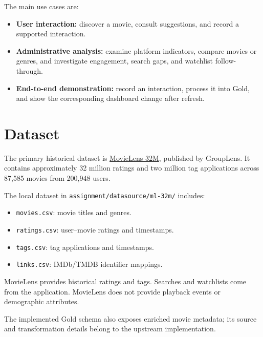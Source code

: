 \documentclass[a4paper,12pt]{article}
\begin{document}
The main use cases are:

\begin{itemize}
  \item \textbf{User interaction:}
  discover a movie, consult suggestions, and record
  a supported interaction.

  \item \textbf{Administrative analysis:}
  examine platform indicators, compare movies or genres,
  and investigate engagement, search gaps, and watchlist
  follow-through.

  \item \textbf{End-to-end demonstration:}
  record an interaction, process it into Gold, and show
  the corresponding dashboard change after refresh.
\end{itemize}


\clearpage
\section{Dataset}
\label{sec:dataset}

The primary historical dataset is
\href{https://grouplens.org/datasets/movielens/32m/}{MovieLens 32M},
published by GroupLens. It contains approximately 32 million ratings
and two million tag applications across 87,585 movies from
200,948 users.

The local dataset in \texttt{assignment/datasource/ml-32m/} includes:

\begin{itemize}
  \item \texttt{movies.csv}: movie titles and genres.
  \item \texttt{ratings.csv}: user--movie ratings and timestamps.
  \item \texttt{tags.csv}: tag applications and timestamps.
  \item \texttt{links.csv}: IMDb/TMDB identifier mappings.
\end{itemize}

MovieLens provides historical ratings and tags. Searches and
watchlists come from the application. MovieLens does not provide
playback events or demographic attributes.

The implemented Gold schema also exposes enriched movie metadata;
its source and transformation details belong to the upstream
implementation.
\end{document}
